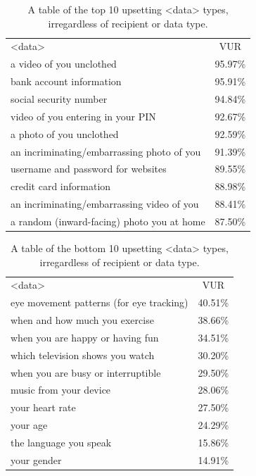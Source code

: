 \documentclass{acm_proc_article-sp}
\begin{document}
\begin{table}[t]
\begin{center}
\begin{tabular}{| l | c |}

<data> &  VUR  \\
a video of you unclothed & 95.97\% \\
bank account information & 95.91\% \\
social security number & 94.84\% \\
video of you entering in your PIN & 92.67\% \\
a photo of you unclothed & 92.59\% \\
an incriminating/embarrassing photo of you & 91.39\% \\
username and password for websites & 89.55\% \\
credit card information & 88.98\% \\
an incriminating/embarrassing video of you & 88.41\% \\
a random (inward-facing) photo you at home & 87.50\% \\

\end{tabular}
\caption{A table of the top 10 upsetting <data> types, irregardless of recipient or data type.}
\label{top10}
\end{center}
\end{table}

\begin{table}[t]
\begin{center}
\begin{tabular}{| l | c |}
<data> &  VUR  \\
eye movement patterns (for eye tracking) & 40.51\% \\
when and how much you exercise  & 38.66\% \\
when you are happy or having fun  & 34.51\% \\
which television shows you watch & 30.20\% \\
when you are busy or interruptible  & 29.50\% \\
music from your device  & 28.06\% \\
your heart rate & 27.50\% \\
your age & 24.29\% \\
the language you speak & 15.86\% \\
your gender & 14.91\% \\ 

\end{tabular}
\caption{A table of the bottom 10 upsetting <data> types, irregardless of recipient or data type.}
\label{bottom10}
\end{center}
\end{table}
\end{document}
